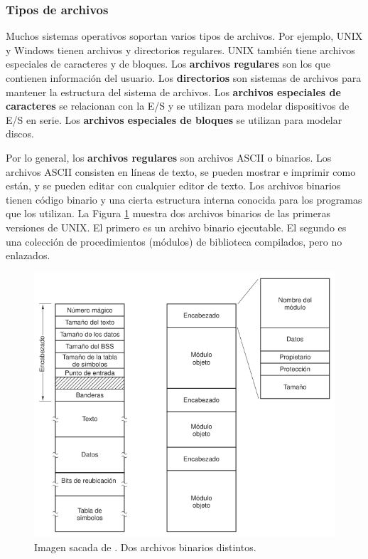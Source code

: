\documentclass[12pt]{article}
\begin{document}
  \subsubsection{Tipos de archivos}
  Muchos sistemas operativos soportan varios tipos de archivos. Por ejemplo, UNIX y Windows tienen archivos y directorios regulares. UNIX también tiene archivos especiales de caracteres y de bloques. Los \textbf{archivos regulares} son los que contienen información del usuario. Los \textbf{directorios} son sistemas de archivos para mantener la estructura del sistema de archivos. Los \textbf{archivos especiales de caracteres} se relacionan con la E/S y se utilizan para modelar dispositivos de E/S en serie. Los \textbf{archivos especiales de bloques} se utilizan para modelar discos.

  Por lo general, los \textbf{archivos regulares} son archivos ASCII o binarios. Los archivos ASCII consisten en líneas de texto, se pueden mostrar e imprimir como están, y se pueden editar con cualquier editor de texto. Los archivos binarios tienen código binario y una cierta estructura interna conocida para los programas que los utilizan. La Figura \ref{fig:archivos-binarios} muestra dos archivos binarios de las primeras versiones de UNIX. El primero es un archivo binario ejecutable. El segundo es una colección de procedimientos (módulos) de biblioteca compilados, pero no enlazados.

  \begin{figure}[H]
    \centering
    \includegraphics[width=\linewidth]{imagenes/archivos-binarios.png}
    \caption{Imagen sacada de \parencite{tanenbaum}. Dos archivos binarios distintos.}
    \label{fig:archivos-binarios}
  \end{figure}
\end{document}
